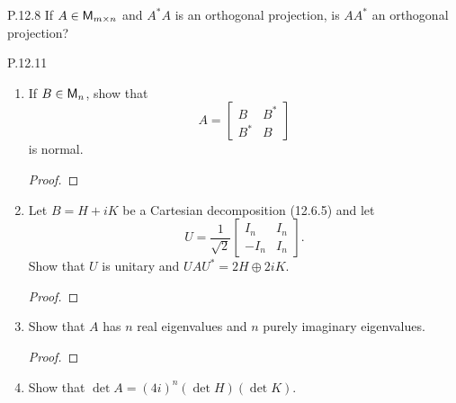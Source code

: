 \documentclass{../homework}
\date{Tuesday 4/23}
\author{}
\begin{document}
\begin{problems}
\item[P.12.8] If \(A \in \mathsf{M}_{m \times n}\) and \(A^* A\) is an
  orthogonal projection, is \(AA^*\) an orthogonal projection?

  \begin{solution}

  \end{solution}

\item[P.12.11]
  \begin{enumerate}
  \item If \(B \in \mathsf{M}_n\), show that
    \[
      A = \begin{bmatrix} B & B^* \\ B^* & B \end{bmatrix}
    \]
    is normal.

    \begin{solution}
      \begin{proof}

      \end{proof}
    \end{solution}

  \item Let \(B = H + iK\) be a Cartesian decomposition (12.6.5) and
    let
    \[
      U = \frac{1}{\sqrt 2}
      \begin{bmatrix}
        I_n & I_n \\ -I_n & I_n
      \end{bmatrix}.
    \]
    Show that \(U\) is unitary and \(UAU^* = 2H \oplus 2 iK\).

    \begin{solution}
      \begin{proof}

      \end{proof}
    \end{solution}

  \item Show that \(A\) has \(n\) real eigenvalues and \(n\) purely
    imaginary eigenvalues.

    \begin{solution}
      \begin{proof}

      \end{proof}
    \end{solution}

  \item Show that \(\det A = (4i)^n (\det H) (\det K)\).


\end{enumerate}
\end{problems}
\end{document}
